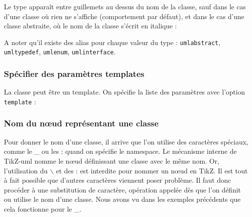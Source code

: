 \documentclass[a4paper,11pt]{report}
\newcommand{\inputTikZ}[1]{%
  }%
\newcommand{\inputTikZ}[1]{%
    \texttt{[image: fig/\#1.pdf]}%
  }%
\newcommand{\tuml}{{\sc TikZ-uml}}
\newcommand{\TikZ}{{\sc TikZ}}
\begin{document}
\medskip

Le type apparaît entre guillemets au dessus du nom de la classe, sauf dans le cas d'une classe où rien ne s'affiche (comportement par défaut), et dans le cas d'une classe abstraite, où le nom de la classe s'écrit en italique :

\medskip

\begin{minipage}{0.5\textwidth}

\end{minipage}
\begin{minipage}{0.4\textwidth}
\begin{center}
\inputTikZ{classabstract}
\end{center}
\end{minipage}

A noter qu'il existe des alias pour chaque valeur du type : {\tt umlabstract}, {\tt umltypedef}, {\tt umlenum}, {\tt umlinterface}.

\subsubsection{Spécifier des paramètres templates}

La classe peut être un template. On spécifie la liste des paramètres avec l'option {\tt template} :

\medskip

\begin{minipage}{0.5\textwidth}

\end{minipage}
\begin{minipage}{0.4\textwidth}
\begin{center}
\inputTikZ{classtemplate}
\end{center}
\end{minipage}

\subsubsection{Nom du n\oe{}ud représentant une classe}

Pour donner le nom d'une classe, il arrive que l'on utilise des caractères spéciaux, comme le \_{} ou les : quand on spécifie le namespace. Le mécanisme interne de \tuml{} nomme le n\oe{}ud définissant une classe avec le même nom. Or, l'utilisation du $\backslash$ et des : est interdite pour nommer un n\oe{}ud en \TikZ. Il est tout à fait possible que d'autres caractères viennent poser problème. Il faut donc procéder à une substitution de caractère, opération appelée dès que l'on définit ou utilise le nom d'une classe. Nous avons vu dans les exemples précédents que cela fonctionne pour le \_{}.
\end{document}
